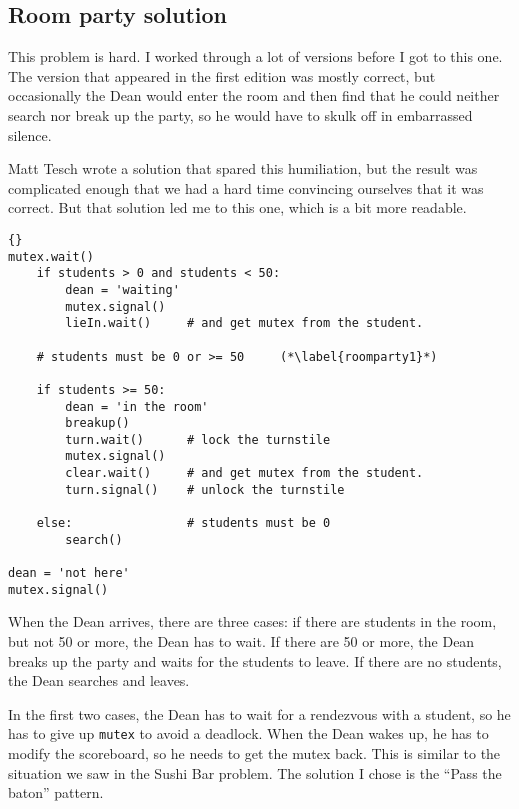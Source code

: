 \documentclass{book}
\begin{document}
\subsection {Room party solution}

This problem is hard.  I worked through a lot of versions before
I got to this one.  The version that appeared in the first edition
was mostly correct, but occasionally the Dean would enter the
room and then find that he could neither search nor break up the
party, so he would have to skulk off in embarrassed silence.

Matt Tesch wrote a solution that spared this humiliation, but the
result was complicated enough that we had a hard time convincing
ourselves that it was correct.  But that solution led me to this one,
which is a bit more readable.

\begin{lstlisting}[title={Room party solution (dean)}]{}
mutex.wait()
    if students > 0 and students < 50:
        dean = 'waiting'
        mutex.signal()
        lieIn.wait()     # and get mutex from the student.

    # students must be 0 or >= 50     (*\label{roomparty1}*)

    if students >= 50:
        dean = 'in the room'
        breakup()
        turn.wait()      # lock the turnstile
        mutex.signal()
        clear.wait()     # and get mutex from the student.
        turn.signal()    # unlock the turnstile

    else:                # students must be 0
        search()

dean = 'not here'
mutex.signal() 
\end{lstlisting}

When the Dean arrives, there are three cases: if there are students in
the room, but not 50 or more, the Dean has to wait.  If there are 50
or more, the Dean breaks up the party and waits for the students to
leave.  If there are no students, the Dean searches and leaves.

In the first two cases, the Dean has to wait for a rendezvous with a
student, so he has to give up {\tt mutex} to avoid a deadlock.  When
the Dean wakes up, he has to modify the scoreboard, so he needs to get
the mutex back.  This is similar to the situation we saw in the Sushi
Bar problem.  The solution I chose is the ``Pass the baton'' pattern.
\end{document}
